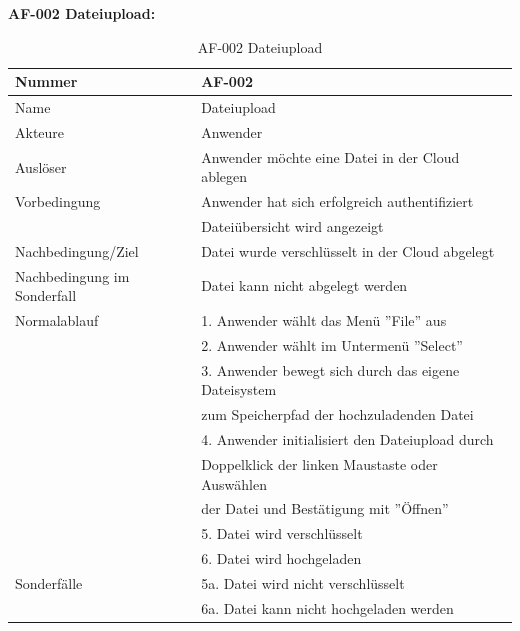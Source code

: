 \documentclass[12pt,a4paper,bibliography=totocnumbered,listof=totocnumbered]{scrartcl}
\begin{document}
\begin{appendix}
\textbf{AF-002 Dateiupload:}
\begin{table}[!h]
	\centering
	\begin{tabular}{|l|l|}
		\hline
		Nummer & AF-002\\
		\hline
		Name & Dateiupload\\
		\hline
		Akteure & Anwender\\
		\hline
		Auslöser & Anwender möchte eine Datei in der Cloud ablegen\\
		\hline
		Vorbedingung & Anwender hat sich erfolgreich authentifiziert \\ & Dateiübersicht wird angezeigt\\
		\hline
		Nachbedingung/Ziel & Datei wurde verschlüsselt in der Cloud abgelegt \\
		\hline
		Nachbedingung im Sonderfall & Datei kann nicht abgelegt werden\\
		\hline
		Normalablauf & 1. Anwender wählt das Menü ''File'' aus \\ & 2. Anwender wählt im Untermenü ''Select'' \\ & 3. Anwender bewegt sich durch das eigene Dateisystem \\ & zum 				Speicherpfad der hochzuladenden Datei \\ & 4. Anwender initialisiert den Dateiupload durch \\ &  Doppelklick der linken Maustaste oder Auswählen \\ & der Datei und Bestätigung                  mit ''Öffnen'' \\  & 5. Datei wird verschlüsselt \\ & 6. Datei wird hochgeladen \\
		\hline
		Sonderfälle & 5a. Datei wird nicht verschlüsselt \\ & 6a. Datei kann nicht hochgeladen werden\\
		\hline
	\end{tabular}
	\caption{AF-002 Dateiupload}
	\label{tab:AF-002 Dateiupload}
\end{table}
\pagebreak


\end{appendix}
\end{document}
